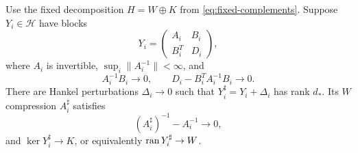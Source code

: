 \begin{lemma}
\label{lem:hankel-rank-correction}
Use the fixed decomposition $H=W\oplus K$ from
\eqref{eq:fixed-complements}. Suppose $Y_i\in\mathcal H$ have blocks
\[
 Y_i=\begin{pmatrix}A_i&B_i\\B_i^T&D_i\end{pmatrix},
\]
where $A_i$ is invertible, $\sup_i\|A_i^{-1}\|<\infty$, and
\[
 A_i^{-1}B_i\longrightarrow0,
 \qquad D_i-B_i^TA_i^{-1}B_i\longrightarrow0.
\]
There are Hankel perturbations $\Delta_i\to0$ such that
$Y_i^\sharp=Y_i+\Delta_i$ has rank $d_*$. Its $W$ compression
$A_i^\sharp$ satisfies
\[
 (A_i^\sharp)^{-1}-A_i^{-1}\longrightarrow0,
\]
and $\ker Y_i^\sharp\to K$, or equivalently
$\operatorname{ran} Y_i^\sharp\to W$.
\end{lemma}

